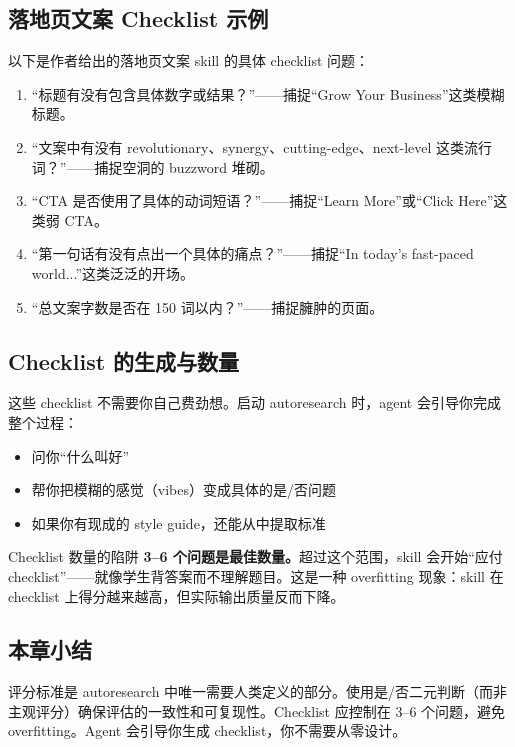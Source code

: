 \documentclass[a4paper]{article}
\begin{document}
\subsection{落地页文案 Checklist 示例}

以下是作者给出的落地页文案 skill 的具体 checklist 问题：

\begin{enumerate}
    \item ``标题有没有包含具体数字或结果？''——捕捉``Grow Your Business''这类模糊标题。
    \item ``文案中有没有 revolutionary、synergy、cutting-edge、next-level 这类流行词？''——捕捉空洞的 buzzword 堆砌。
    \item ``CTA 是否使用了具体的动词短语？''——捕捉``Learn More''或``Click Here''这类弱 CTA。
    \item ``第一句话有没有点出一个具体的痛点？''——捕捉``In today's fast-paced world...''这类泛泛的开场。
    \item ``总文案字数是否在 150 词以内？''——捕捉臃肿的页面。
\end{enumerate}

\subsection{Checklist 的生成与数量}

这些 checklist 不需要你自己费劲想。启动 autoresearch 时，agent 会引导你完成整个过程：

\begin{itemize}
    \item 问你``什么叫好''
    \item 帮你把模糊的感觉（vibes）变成具体的是/否问题
    \item 如果你有现成的 style guide，还能从中提取标准
\end{itemize}

\begin{warningbox}{Checklist 数量的陷阱}
\textbf{3--6 个问题是最佳数量。}超过这个范围，skill 会开始``应付 checklist''——就像学生背答案而不理解题目。这是一种 overfitting 现象：skill 在 checklist 上得分越来越高，但实际输出质量反而下降。
\end{warningbox}

\subsection{本章小结}

评分标准是 autoresearch 中唯一需要人类定义的部分。使用是/否二元判断（而非主观评分）确保评估的一致性和可复现性。Checklist 应控制在 3--6 个问题，避免 overfitting。Agent 会引导你生成 checklist，你不需要从零设计。
\end{document}
